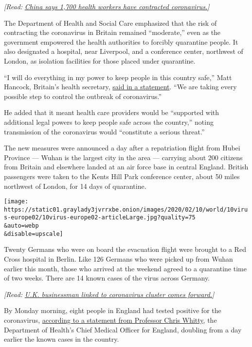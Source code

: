 \emph{{[}Read:}
\href{https://www.nytimes3xbfgragh.onion/2020/02/14/world/asia/china-coronavirus.html}{\emph{China
says 1,700 health workers have contracted coronavirus.}}\emph{{]}}

The Department of Health and Social Care emphasized that the risk of
contracting the coronavirus in Britain remained ``moderate,'' even as
the government empowered the health authorities to forcibly quarantine
people. It also designated a hospital, near Liverpool, and a conference
center, northwest of London, as isolation facilities for those placed
under quarantine.

``I will do everything in my power to keep people in this country
safe,'' Matt Hancock, Britain's health secretary,
\href{https://www.gov.uk/government/news/health-secretary-announces-strengthened-legal-powers-to-bolster-public-health-protections-against-coronavirus}{said
in a statement}. ``We are taking every possible step to control the
outbreak of coronavirus.''

He added that it meant health care providers would be ``supported with
additional legal powers to keep people safe across the country,'' noting
transmission of the coronavirus would ``constitute a serious threat.''

The new measures were announced a day after a repatriation flight from
Hubei Province --- Wuhan is the largest city in the area --- carrying
about 200 citizens from Britain and elsewhere landed at an air force
base in central England. British passengers were taken to the Kents Hill
Park conference center, about 50 miles northwest of London, for 14 days
of quarantine.

\texttt{[image: https://static01.graylady3jvrrxbe.onion/images/2020/02/10/world/10virus-europe02/10virus-europe02-articleLarge.jpg?quality=75\\\&auto=webp\\\&disable=upscale]}

Twenty Germans who were on board the evacuation flight were brought to a
Red Cross hospital in Berlin. Like 126 Germans who were picked up from
Wuhan earlier this month, those who arrived at the weekend agreed to a
quarantine time of two weeks. There are 14 known cases of the virus
across Germany.

\emph{{[}Read:}
\href{http://www.nytimes3xbfgragh.onion/2020/02/11/world/europe/coronavirus-britain-steve-walsh.html}{\emph{U.K.
businessman linked to coronavirus cluster comes forward.}}\emph{{]}}

By Monday morning, eight people in England had tested positive for the
coronavirus,
\href{https://www.gov.uk/government/news/chief-medical-officer-for-england-announces-four-further-coronavirus-cases}{according
to a statement from Professor Chris Whitty}, the Department of Health's
Chief Medical Officer for England, doubling from a day earlier the known
cases in the country.

